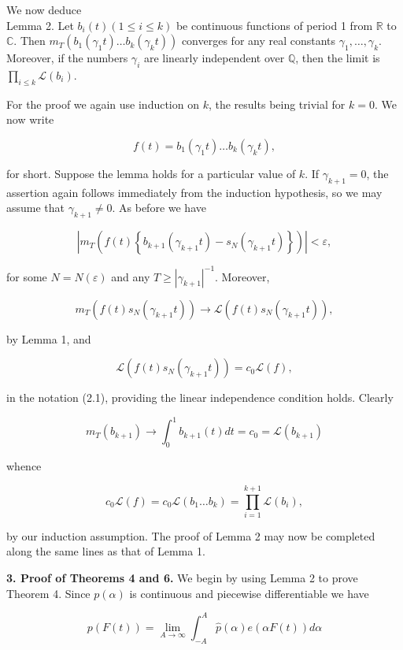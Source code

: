 \documentclass[10pt]{article}
\newcommand{\articleSection}[2]{%
  \par\medskip\noindent\textbf{#1. #2.}\enspace
}
\begin{document}
We now deduce\\
Lemma 2. Let $b_{i}(t)(1 \leq i \leq k)$ be continuous functions of period 1 from $\mathbb{R}$ to $\mathbb{C}$. Then $m_{T}\left(b_{1}\left(\gamma_{1} t\right) \ldots b_{k}\left(\gamma_{k} t\right)\right)$ converges for any real constants $\gamma_{1}, \ldots, \gamma_{k}$. Moreover, if the numbers $\gamma_{i}$ are linearly independent over $\mathbb{Q}$, then the limit is $\prod_{i \leq k} \mathcal{L}\left(b_{i}\right)$.

For the proof we again use induction on $k$, the results being trivial for $k=0$. We now write

$$
f(t)=b_{1}\left(\gamma_{1} t\right) \ldots b_{k}\left(\gamma_{k} t\right),
$$

for short. Suppose the lemma holds for a particular value of $k$. If $\gamma_{k+1}=0$, the assertion again follows immediately from the induction hypothesis, so we may assume that $\gamma_{k+1}\neq 0$. As before we have

$$
\left|m_{T}\left(f(t)\left\{b_{k+1}\left(\gamma_{k+1} t\right)-s_{N}\left(\gamma_{k+1} t\right)\right\}\right)\right|<\varepsilon,
$$

for some $N=N(\varepsilon)$ and any $T \geq |\gamma_{k+1}|^{-1}$. Moreover,

$$
m_{T}\left(f(t) s_{N}\left(\gamma_{k+1} t\right)\right) \rightarrow \mathcal{L}\left(f(t) s_{N}\left(\gamma_{k+1} t\right)\right),
$$

by Lemma 1, and

$$
\mathcal{L}\left(f(t) s_{N}\left(\gamma_{k+1} t\right)\right)=c_{0} \mathcal{L}(f),
$$

in the notation (2.1), providing the linear independence condition holds. Clearly

$$
m_{T}\left(b_{k+1}\right) \rightarrow \int_{0}^{1} b_{k+1}(t) d t=c_{0}=\mathcal{L}\left(b_{k+1}\right)
$$

whence

$$
c_{0} \mathcal{L}(f)=c_{0} \mathcal{L}\left(b_{1} \ldots b_{k}\right)=\prod_{i=1}^{k+1} \mathcal{L}\left(b_{i}\right),
$$

by our induction assumption. The proof of Lemma 2 may now be completed along the same lines as that of Lemma 1.

\articleSection{3}{Proof of Theorems 4 and 6}We begin by using Lemma 2 to prove Theorem 4. Since $p(\alpha)$ is continuous and piecewise differentiable we have

$$
p(F(t))=\lim _{A \rightarrow \infty} \int_{-A}^{A} \widehat{p}(\alpha) e(\alpha F(t)) d \alpha
$$
\end{document}
